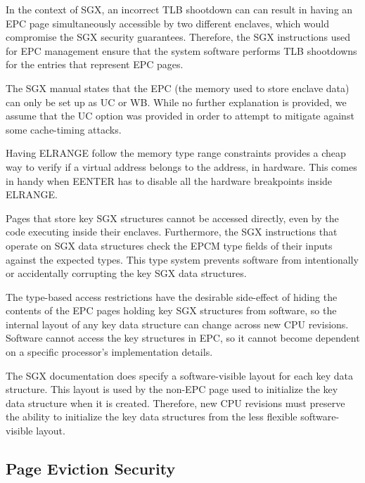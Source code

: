 In the context of SGX, an incorrect TLB shootdown can can result in having an
EPC page simultaneously accessible by two different enclaves, which would
compromise the SGX security guarantees. Therefore, the SGX instructions used
for EPC management ensure that the system software performs TLB shootdowns for
the entries that represent EPC pages.


The SGX manual states that the EPC (the memory used to store enclave data) can
only be set up as UC or WB. While no further explanation is provided, we assume
that the UC option was provided in order to attempt to mitigate against some
cache-timing attacks.


Having ELRANGE follow the memory type range constraints provides a cheap way to
verify if a virtual address belongs to the address, in hardware. This comes in
handy when EENTER has to disable all the hardware breakpoints inside ELRANGE.



Pages that store key SGX structures cannot be accessed directly, even by the
code executing inside their enclaves. Furthermore, the SGX instructions that
operate on SGX data structures check the EPCM type fields of their inputs
against the expected types. This type system prevents software from
intentionally or accidentally corrupting the key SGX data structures.

The type-based access restrictions have the desirable side-effect of hiding the
contents of the EPC pages holding key SGX structures from software, so the
internal layout of any key data structure can change across new CPU revisions.
Software cannot access the key structures in EPC, so it cannot become dependent
on a specific processor's implementation details.

The SGX documentation does specify a software-visible layout for each key data
structure. This layout is used by the non-EPC page used to initialize the key
data structure when it is created. Therefore, new CPU revisions must preserve
the ability to initialize the key data structures from the less flexible
software-visible layout.


\subsection {Page Eviction Security}

